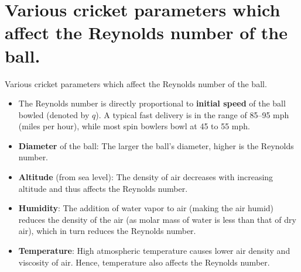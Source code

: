 \documentclass{beamer}
\begin{document}
\section{Various cricket parameters which affect the Reynolds number of the ball.}
\begin{frame}{Various cricket parameters which affect the Reynolds number of the ball.}
    \begin{itemize}
    \item 
    The Reynolds number is directly proportional to \textbf{initial speed} of the ball bowled (denoted by $q$). A typical fast delivery is in the range of 85–95 mph (miles per hour), while most spin bowlers bowl at 45 to 55 mph.
     \item
    \textbf{Diameter} of the ball: The larger the ball's diameter, higher is the Reynolds number.
    \item 
    \textbf{Altitude} (from sea level): The density of air decreases with increasing altitude and thus affects the Reynolds number.
    \item
    \textbf{Humidity}: The addition of water vapor to air (making the air humid) reduces the density of the air (as molar mass of water is less than that of dry air), which in turn reduces the Reynolds number. 
    \item
    \textbf{Temperature}: High atmospheric temperature causes lower air density and  viscosity of air. Hence, temperature also affects the Reynolds number.
  \end{itemize}
\end{frame}
\end{document}
